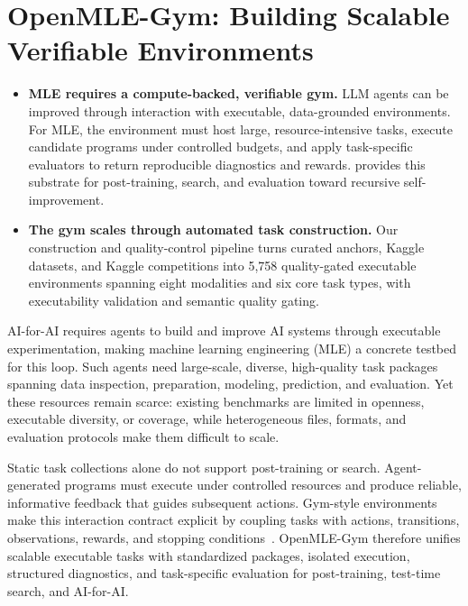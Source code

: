 \section{OpenMLE-Gym: Building Scalable Verifiable Environments}
\label{sec:framework}
\label{sec:task-curation-data-construction}

\begin{takeaway}
\begin{itemize}[leftmargin=*,itemsep=1pt,topsep=2pt,partopsep=0pt,parsep=0pt]
\item \textbf{MLE requires a compute-backed, verifiable gym.} LLM agents can be improved through interaction with executable, data-grounded environments. For MLE, the environment must host large, resource-intensive tasks, execute candidate programs under controlled budgets, and apply task-specific evaluators to return reproducible diagnostics and rewards. \openmlegym{} provides this substrate for post-training, search, and evaluation toward recursive self-improvement.
\item \textbf{The gym scales through automated task construction.} Our construction and quality-control pipeline turns curated anchors, Kaggle datasets, and Kaggle competitions into 5,758 quality-gated executable environments spanning eight modalities and six core task types, with executability validation and semantic quality gating.
\end{itemize}
\end{takeaway}

AI-for-AI requires agents to build and improve AI systems through executable experimentation, making machine learning engineering (MLE) a concrete testbed for this loop. Such agents need large-scale, diverse, high-quality task packages spanning data inspection, preparation, modeling, prediction, and evaluation. Yet these resources remain scarce: existing benchmarks are limited in openness, executable diversity, or coverage, while heterogeneous files, formats, and evaluation protocols make them difficult to scale.

Static task collections alone do not support post-training or search. Agent-generated programs must execute under controlled resources and produce reliable, informative feedback that guides subsequent actions. Gym-style environments make this interaction contract explicit by coupling tasks with actions, transitions, observations, rewards, and stopping conditions~\citep{brockman2016openai,xi2024agentgym,nathani2025mlgym,qiang2025mledojo}. OpenMLE-Gym therefore unifies scalable executable tasks with standardized packages, isolated execution, structured diagnostics, and task-specific evaluation for post-training, test-time search, and AI-for-AI.

